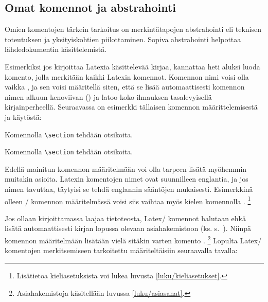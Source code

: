 \subsection{Omat komennot ja abstrahointi}
\label{luku/komennot-abst}

Omien komentojen tärkein tarkoitus on merkintätapojen abstrahointi eli
teknisen toteutuksen ja yksityiskohtien piilottaminen. Sopiva
abstrahointi helpottaa lähdedokumentin käsittelemistä.

Esimerkiksi jos kirjoittaa Latexia käsittelevää kirjaa, kannattaa heti
aluksi luoda komento, jolla merkitään kaikki Latexin komennot. Komennon
nimi voisi olla vaikka , ja sen voisi määritellä
siten, että se lisää automaattisesti komennon nimen alkuun kenoviivan
(\keno) ja latoo koko ilmauksen tasalevyisellä kirjainperheellä.
Seuraavassa on esimerkki tällaisen komennon määrittelemisestä ja
käytöstä:

\begin{koodilohkosis}
\newcommand{\komento}[1]{\texttt{\textbackslash #1}}

Komennolla \komento{section} tehdään otsikoita.
\end{koodilohkosis}

\begin{tulossis}
  Komennolla \texttt{\textbackslash section} tehdään otsikoita.
\end{tulossis}

\noindent
Edellä mainitun komennon määritelmään voi olla tarpeen lisätä myöhemmin
muitakin asioita. Latexin komentojen nimet ovat suunnilleen englantia,
ja jos nimen tavuttaa, täytyisi se tehdä englannin sääntöjen mukaisesti.
Esimerkkinä olleen \-/ komennon määritelmässä voisi
siis vaihtaa myös kielen komennolla .%
\footnote{Lisätietoa kieliasetuksista voi lukea luvusta
  \ref{luku/kieliasetukset}.}

Jos ollaan kirjoittamassa laajaa tietoteosta, Latex\-/ komennot halutaan
ehkä lisätä automaattisesti kirjan lopussa olevaan asiahakemistoon (ks.
s.~\pageref{luku/asiahakemisto}). Niinpä komennon määritelmään lisätään
vielä sitäkin varten komento .%
\footnote{Asiahakemistoja käsitellään luvussa \ref{luku/asiasanat}.}
Lopulta Latex\-/ komentojen merkitsemiseen tarkoitettu
 määriteltäisiin seuraavalla tavalla:

\begin{koodilohkosis}
\newcommand{\komento}[1]{%
  \texttt{\textbackslash\textenglish{#1}}%
  \index[komennot]{#1@\texttt{\textbackslash #1}}}
\end{koodilohkosis}

